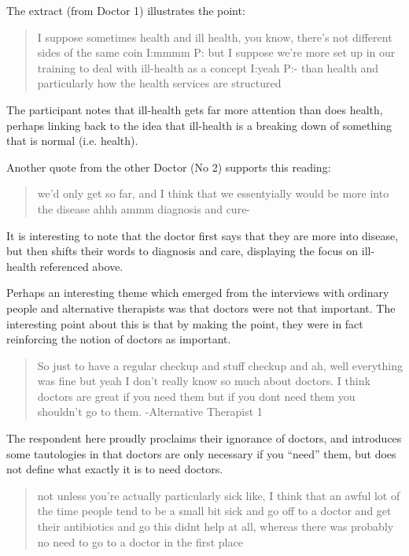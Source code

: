 The extract (from Doctor 1) illustrates the point: 

\begin{quotation}
  I suppose sometimes health and ill health, you know, there's not different sides of the same coin
I:mmmm
P: but I suppose we're more set up in our training to deal with ill-health as a concept
I:yeah
P:- than health and particularly how the health services are structured 

\end{quotation}

The participant notes that ill-health gets far more attention than does health, perhaps linking back to the idea that ill-health is a breaking down of something that is normal (i.e. health). 

Another quote from the other Doctor (No 2) supports this reading:

\begin{quotation}
  we'd only get so far, and I think that we essentyially would be more into the disease ahhh ammm diagnosis and cure-

\end{quotation}

It is interesting to note that the doctor first says that they are more into disease, but then shifts their words to diagnosis and care, displaying the focus on ill-health referenced above. 


Perhaps an interesting theme which emerged from the interviews with ordinary people and alternative therapists was that doctors were not that important. The interesting point about this is that by making the point, they were in fact reinforcing the notion of doctors as important. 

\begin{quotation}
  So just to have a regular checkup and stuff checkup and ah, well everything was fine but yeah I don't really know so much about doctors. I think doctors are great if you need them but if you dont need them you shouldn't go to them.  -Alternative Therapist 1

\end{quotation} 

The respondent here proudly proclaims their ignorance of doctors, and introduces some tautologies in that doctors are only necessary if you ``need'' them, but does not define what exactly it is to need doctors. 

\begin{quotation}
  not unless you're actually particularly sick like, I think that an awful lot of the time people tend to be a small bit sick and go off to a doctor and get their antibiotics and go this didnt help at all, whereas there was probably no need to go to a doctor in the first place 

\end{quotation}

